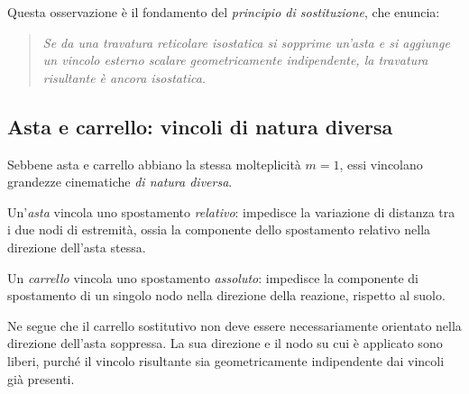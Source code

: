 Questa osservazione è il fondamento del \emph{principio
	di sostituzione}, che enuncia:

\begin{quote}
	\itshape
	Se da una travatura reticolare isostatica si
	sopprime un'asta e si aggiunge un vincolo esterno
	scalare geometricamente indipendente, la travatura
	risultante è ancora isostatica.
\end{quote}

\subsection{Asta e carrello: vincoli di natura diversa}
\label{subsec:asta_vs_carrello}

Sebbene asta e carrello abbiano la stessa molteplicità
$m = 1$, essi vincolano grandezze cinematiche
\emph{di natura diversa}.

Un'\emph{asta} vincola uno spostamento \emph{relativo}:
impedisce la variazione di distanza tra i due nodi
di estremità, ossia la componente dello spostamento
relativo nella direzione dell'asta stessa.

Un \emph{carrello} vincola uno spostamento
\emph{assoluto}: impedisce la componente di
spostamento di un singolo nodo nella direzione della
reazione, rispetto al suolo.

Ne segue che il carrello sostitutivo non deve essere
necessariamente orientato nella direzione dell'asta
soppressa. La sua direzione e il nodo su cui è
applicato sono liberi, purché il vincolo risultante
sia geometricamente indipendente dai vincoli già
presenti.

